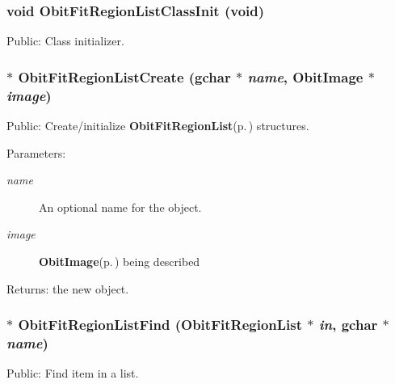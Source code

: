\subsubsection{\setlength{\rightskip}{0pt plus 5cm}void Obit\-Fit\-Region\-List\-Class\-Init (void)}\label{ObitFitRegionList_8h_a4}


Public: Class initializer. 

\subsubsection{$\ast$ Obit\-Fit\-Region\-List\-Create (gchar $\ast$ {\em name}, {\bf Obit\-Image} $\ast$ {\em image})}\label{ObitFitRegionList_8h_a6}


Public: Create/initialize {\bf Obit\-Fit\-Region\-List}{\rm (p.\,\pageref{structObitFitRegionList})} structures. 

\begin{Desc}
\item[Parameters:]
\begin{description}
\item[{\em name}]An optional name for the object. \item[{\em image}]{\bf Obit\-Image}{\rm (p.\,\pageref{structObitImage})} being described \end{description}
\end{Desc}
\begin{Desc}
\item[Returns:]the new object. \end{Desc}
\subsubsection{$\ast$ Obit\-Fit\-Region\-List\-Find ({\bf Obit\-Fit\-Region\-List} $\ast$ {\em in}, gchar $\ast$ {\em name})}\label{ObitFitRegionList_8h_a10}


Public: Find item in a list. 

